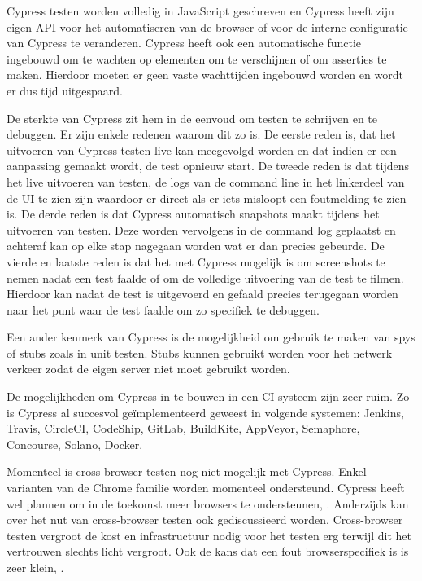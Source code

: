 Cypress testen worden volledig in JavaScript geschreven en Cypress heeft zijn eigen \gls{API} voor het automatiseren van de browser of voor de interne configuratie van Cypress te veranderen. Cypress heeft ook een automatische functie ingebouwd om te wachten op elementen om te verschijnen of om \glspl{assertie} te maken. Hierdoor moeten er geen vaste wachttijden ingebouwd worden en wordt er dus tijd uitgespaard.


De sterkte van Cypress zit hem in de eenvoud om testen te schrijven en te debuggen. Er zijn enkele redenen waarom dit zo is. De eerste reden is, dat het uitvoeren van Cypress testen live kan meegevolgd worden en dat indien er een aanpassing gemaakt wordt, de test opnieuw start. De tweede reden is dat tijdens het live uitvoeren van testen, de logs van de command line in het linkerdeel van de \gls{UI} te zien zijn waardoor er direct als er iets misloopt een foutmelding te zien is. De derde reden is dat Cypress automatisch \glspl{snapshot} maakt tijdens het uitvoeren van testen. Deze worden vervolgens in de command log geplaatst en achteraf kan op elke stap nagegaan worden wat er dan precies gebeurde. De vierde en laatste reden is dat het met Cypress mogelijk is om screenshots te nemen nadat een test faalde of om de volledige uitvoering van de test te filmen. Hierdoor kan nadat de test is uitgevoerd en gefaald precies terugegaan worden naar het punt waar de test faalde om zo specifiek te debuggen.

Een ander kenmerk van Cypress is de mogelijkheid om gebruik te maken van \glspl{spy} of \glspl{stub} zoals in unit testen. Stubs kunnen gebruikt worden voor het netwerk verkeer zodat de eigen server niet moet gebruikt worden.

De mogelijkheden om Cypress in te bouwen in een \gls{CI} systeem zijn zeer ruim. Zo is Cypress al succesvol geïmplementeerd geweest in volgende systemen: Jenkins, Travis, CircleCI, CodeShip, GitLab, BuildKite, AppVeyor, Semaphore, Concourse, Solano, Docker.

Momenteel is cross-browser testen nog niet mogelijk met Cypress. Enkel varianten van de Chrome familie worden momenteel ondersteund. Cypress heeft wel plannen om in de toekomst meer browsers te ondersteunen, \textcite{Mann2017}. Anderzijds kan over het nut van cross-browser testen ook gediscussieerd worden. Cross-browser testen vergroot de kost en infrastructuur nodig voor het testen erg terwijl dit het vertrouwen slechts licht vergroot. Ook de kans dat een fout browserspecifiek is is zeer klein, \textcite{Mann2018}.

